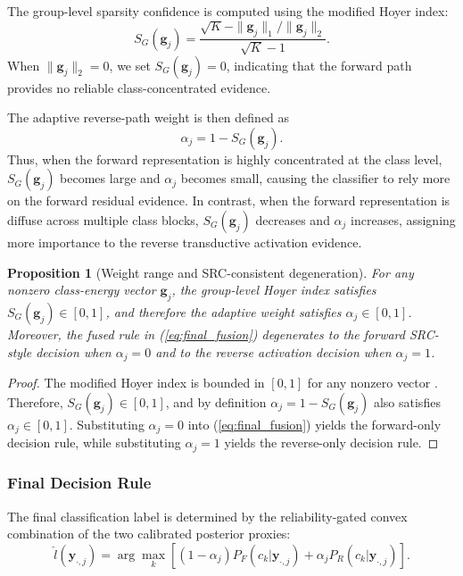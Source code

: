 \documentclass[10pt,comsoc]{IEEEtran}
\newtheorem{proposition}{Proposition}
\begin{document}
The group-level sparsity confidence is computed using the modified Hoyer index:
\begin{equation}
	\label{eq:group_hoyer}
	S_G(\mathbf{g}_j)
	=
	\frac{
		\sqrt{K}-\|\mathbf{g}_j\|_1/\|\mathbf{g}_j\|_2
	}{
		\sqrt{K}-1
	}.
\end{equation}
When $\|\mathbf{g}_j\|_2=0$, we set $S_G(\mathbf{g}_j)=0$, indicating that the forward path provides no reliable class-concentrated evidence.

The adaptive reverse-path weight is then defined as
\begin{equation}
	\label{eq:adaptive_alpha}
	\alpha_j = 1-S_G(\mathbf{g}_j).
\end{equation}
Thus, when the forward representation is highly concentrated at the class level, $S_G(\mathbf{g}_j)$ becomes large and $\alpha_j$ becomes small, causing the classifier to rely more on the forward residual evidence. In contrast, when the forward representation is diffuse across multiple class blocks, $S_G(\mathbf{g}_j)$ decreases and $\alpha_j$ increases, assigning more importance to the reverse transductive activation evidence.

\begin{proposition}[Weight range and SRC-consistent degeneration]
	\label{prop:alpha}
	For any nonzero class-energy vector $\mathbf{g}_j$, the group-level Hoyer index satisfies $S_G(\mathbf{g}_j)\in[0,1]$, and therefore the adaptive weight satisfies $\alpha_j\in[0,1]$. Moreover, the fused rule in (\ref{eq:final_fusion}) degenerates to the forward SRC-style decision when $\alpha_j=0$ and to the reverse activation decision when $\alpha_j=1$.
\end{proposition}

\begin{proof}
	The modified Hoyer index is bounded in $[0,1]$ for any nonzero vector \cite{hoyer2004non, hurley2009comparing}. Therefore, $S_G(\mathbf{g}_j)\in[0,1]$, and by definition $\alpha_j=1-S_G(\mathbf{g}_j)$ also satisfies $\alpha_j\in[0,1]$. Substituting $\alpha_j=0$ into (\ref{eq:final_fusion}) yields the forward-only decision rule, while substituting $\alpha_j=1$ yields the reverse-only decision rule.
\end{proof}

\subsubsection{Final Decision Rule}

The final classification label is determined by the reliability-gated convex combination of the two calibrated posterior proxies:
\begin{equation}
	\label{eq:final_fusion}
	\hat{l}(\mathbf{y}_{\cdot,j})
	=
	\arg\max_{k}
	\left[
	(1-\alpha_j)P_F(c_k|\mathbf{y}_{\cdot,j})
	+
	\alpha_jP_R(c_k|\mathbf{y}_{\cdot,j})
	\right].
\end{equation}
\end{document}
